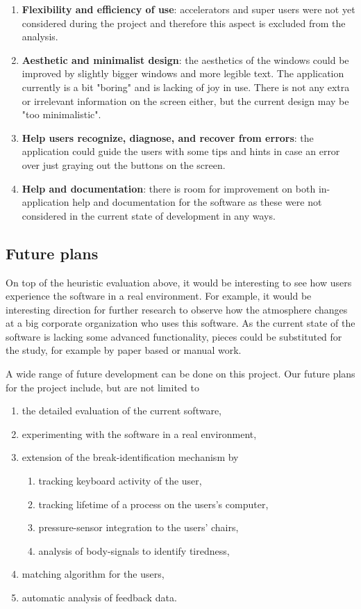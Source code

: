 \begin{enumerate}
	\item \textbf{Flexibility and efficiency of use}: accelerators and super users were not yet considered during the project and therefore this aspect is excluded from the analysis.
	\item \textbf{Aesthetic and minimalist design}: the aesthetics of the windows could be improved by slightly bigger windows and more legible text. The application currently is a bit "boring" and is lacking of joy in use. There is not any extra or irrelevant information on the screen either, but the current design may be "too minimalistic". 
	\item \textbf{Help users recognize, diagnose, and recover from errors}: the application could guide the users with some tips and hints in case an error over just graying out the buttons on the screen. 
	\item \textbf{Help and documentation}: there is room for improvement on both in-application help and documentation for the software as these were not considered in the current state of development in any ways. 
\end{enumerate}

\subsection{Future plans}
On top of the heuristic evaluation above, it would be interesting to see how users experience the software in a real environment. For example, it would be interesting direction for further research to observe how the atmosphere changes at a big corporate organization who uses this software. As the current state of the software is lacking some advanced functionality, pieces could be substituted for the study, for example by paper based or manual work. 

A wide range of future development can be done on this project. Our future plans for the project include, but are not limited to 
\begin{enumerate}
	\item the detailed evaluation of the current software,
	\item experimenting with the software in a real environment,
	\item extension of the break-identification mechanism by
		\begin{enumerate}
			\item tracking keyboard activity of the user,
			\item tracking lifetime of a process on the users's computer,
			\item pressure-sensor integration to the users' chairs,
			\item analysis of body-signals to identify tiredness,
		\end{enumerate}
	\item matching algorithm for the users,
	\item automatic analysis of feedback data.
\end{enumerate}
